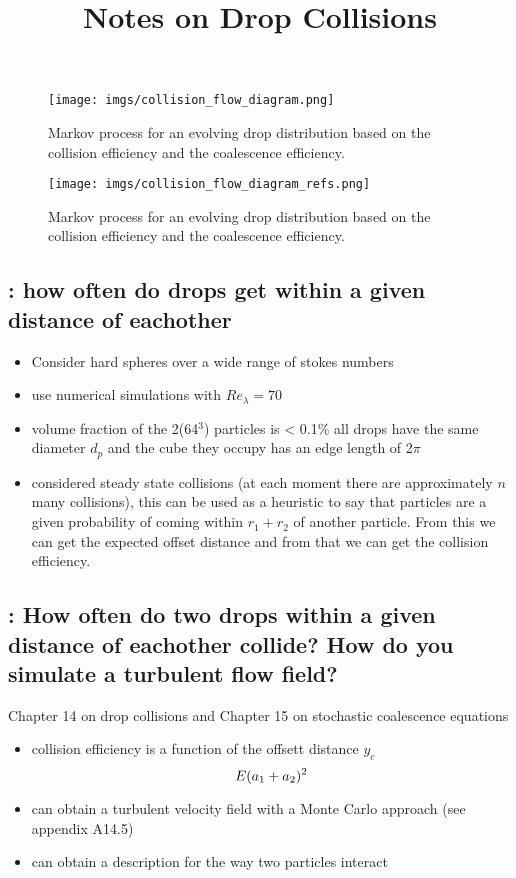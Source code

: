 \documentclass[10pt,a4paper]{article}
\title{Notes on Drop Collisions}
\date{ }
\begin{document}
\maketitle
\begin{figure}[h]
\centering
\texttt{[image: imgs/collision\_flow\_diagram.png]}
\caption{Markov process for an evolving drop distribution based on the collision efficiency and the coalescence efficiency.}
\end{figure}
\begin{figure}[h]
\centering
\texttt{[image: imgs/collision\_flow\_diagram\_refs.png]}
\caption{Markov process for an evolving drop distribution based on the collision efficiency and the coalescence efficiency.}
\end{figure}
\newpage
\subsection*{\citet{Choi2016}: how often do drops get within a given distance of eachother}

\begin{itemize}
\item
Consider hard spheres over a wide range of stokes numbers
\item
use numerical simulations with $Re_\lambda = 70$
\item
volume fraction of the 2(64$^3$) particles is < 0.1\% all drops have the same diameter $d_p$ and the cube they occupy has an edge length of 2$\pi$
\item
considered steady state collisions (at each moment there are approximately $n$ many collisions), this can be used as a heuristic to say that particles are a given probability of coming within $r_1+r_2$ of another particle. From this we can get the expected offset distance and from that we can get the collision efficiency.
\end{itemize}

\subsection*{\citet{Pruppacher1978}: How often do two drops within a given distance of eachother collide? How do you simulate a turbulent flow field?}

Chapter 14 on drop collisions and Chapter 15 on stochastic coalescence equations
\begin{itemize}
\item
collision efficiency is a function of the offsett distance $y_c$
\[ E \def \frac{y_c^2}{(a_1 + a_2)^2} \]
\item
can obtain a turbulent velocity field with a Monte Carlo approach (see appendix A14.5)
\item 
can obtain a description for the way two particles interact
\end{itemize}
\end{document}
